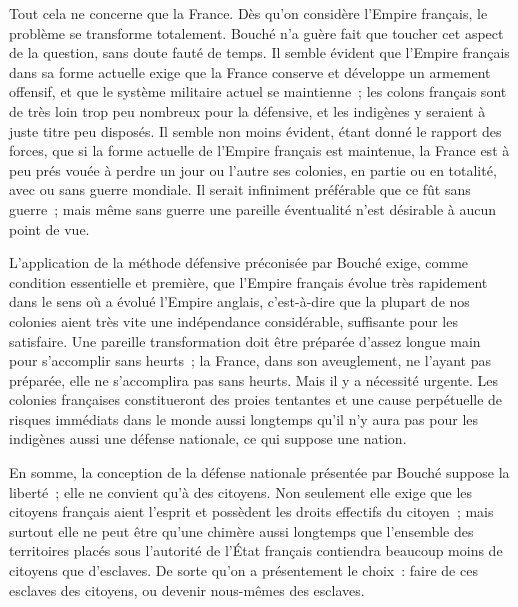 \documentclass[french,twoside]{book} %
\begin{document}
Tout cela ne concerne que la France. Dès qu'on considère l'Empire fran­çais, le problème se transforme totalement. Bouché n'a guère fait que toucher cet aspect de la question, sans doute fauté de temps. Il semble évident que l'Empire français dans sa forme actuelle exige que la France conserve et développe un armement offensif, et que le système militaire actuel se main­tienne ; les colons français sont de très loin trop peu nombreux pour la défensive, et les indigènes y seraient à juste titre peu disposés. Il semble non moins évident, étant donné le rapport des forces, que si la forme actuelle de l'Empire français est maintenue, la France est à peu prés vouée à perdre un jour ou l'autre ses colonies, en partie ou en totalité, avec ou sans guerre mondiale. Il serait infiniment préférable que ce fût sans guerre ; mais même sans guerre une pareille éventualité n'est désirable à aucun point de vue.\par
L'application de la méthode défensive préconisée par Bouché exige, comme condition essentielle et première, que l'Empire français évolue très rapidement dans le sens où a évolué l'Empire anglais, c'est-à-dire que la plu­part de nos colonies aient très vite une indépendance considérable, suffisante pour les satisfaire. Une pareille transformation doit être préparée d'assez longue main pour s'accomplir sans heurts ; la France, dans son aveuglement, ne l'ayant pas préparée, elle ne s'accomplira pas sans heurts. Mais il y a nécessité urgente. Les colonies françaises constitueront des proies tentantes et une cause perpétuelle de risques immédiats dans le monde aussi longtemps qu'il n'y aura pas pour les indigènes aussi une défense nationale, ce qui suppose une nation.\par
En somme, la conception de la défense nationale présentée par Bouché suppose la liberté ; elle ne convient qu'à des citoyens. Non seulement elle exige que les citoyens français aient l'esprit et possèdent les droits effectifs du citoyen ; mais surtout elle ne peut être qu'une chimère aussi longtemps que l'ensemble des territoires placés sous l'autorité de l'État français contiendra beaucoup moins de citoyens que d'esclaves. De sorte qu'on a présentement le choix : faire de ces esclaves des citoyens, ou devenir nous-mêmes des esclaves.\par

\begin{center}
\end{center}
\end{document}
